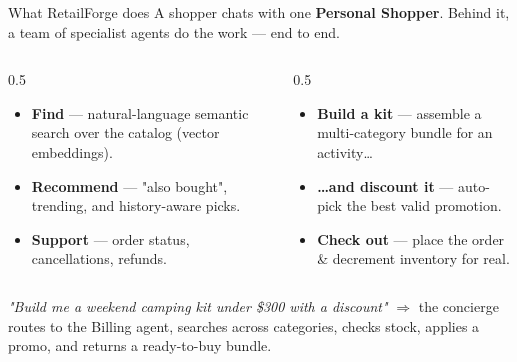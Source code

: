 \documentclass[aspectratio=169,11pt]{beamer}
\begin{document}
\begin{frame}{What RetailForge does}
A shopper chats with one \textbf{Personal Shopper}. Behind it, a team of specialist
agents do the work --- end to end.
\vspace{0.4em}
\begin{columns}[T]
\begin{column}{0.5\textwidth}
\begin{itemize}
  \item \textbf{Find} --- natural-language semantic search over the catalog (vector embeddings).
  \item \textbf{Recommend} --- "also bought", trending, and history-aware picks.
  \item \textbf{Support} --- order status, cancellations, refunds.
\end{itemize}
\end{column}
\begin{column}{0.5\textwidth}
\begin{itemize}
  \item \textbf{Build a kit} --- assemble a multi-category bundle for an activity\dots
  \item \textbf{\dots and discount it} --- auto-pick the best valid promotion.
  \item \textbf{Check out} --- place the order \& decrement inventory for real.
\end{itemize}
\end{column}
\end{columns}
\vfill
\begin{center}
\setlength{\fboxsep}{6pt}\setlength{\fboxrule}{0pt}%
\colorbox{surface}{\parbox{0.92\textwidth}{\centering
\textit{"Build me a weekend camping kit under \$300 with a discount"} $\Rightarrow$
the concierge routes to the Billing agent, searches across categories, checks stock,
applies a promo, and returns a ready-to-buy bundle.}}
\end{center}
\end{frame}
\end{document}
